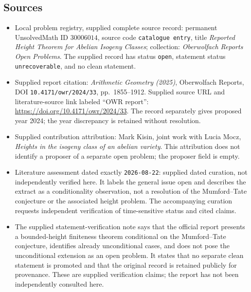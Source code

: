 \documentclass[11pt]{article}
\begin{document}
\subsection{Sources}
\begin{itemize}
\item Local problem registry, supplied complete source record: permanent UnsolvedMath ID \(30006014\), source code \texttt{catalogue entry}, title \emph{Reported Height Theorem for Abelian Isogeny Classes}; collection: \emph{Oberwolfach Reports Open Problems}. The supplied record has status \texttt{open}, statement status \texttt{unrecoverable}, and no clean statement.
\item Supplied report citation: \emph{Arithmetic Geometry (2025)}, Oberwolfach Reports, DOI \texttt{10.4171/owr/2024/33}, pp.\ 1855--1912. Supplied source URL and literature-source link labeled ``OWR report'': \url{https://doi.org/10.4171/owr/2024/33}. The record separately gives proposed year 2024; the year discrepancy is retained without resolution.
\item Supplied contribution attribution: Mark Kisin, joint work with Lucia Mocz, \emph{Heights in the isogeny class of an abelian variety}. This attribution does not identify a proposer of a separate open problem; the proposer field is empty.
\item Literature assessment dated exactly \texttt{2026-08-22}: supplied dated curation, not independently verified here. It labels the general issue open and describes the extract as a conditionality observation, not a resolution of the Mumford--Tate conjecture or the associated height problem. The accompanying curation requests independent verification of time-sensitive status and cited claims.
\item The supplied statement-verification note says that the official report presents a bounded-height finiteness theorem conditional on the Mumford--Tate conjecture, identifies already unconditional cases, and does not pose the unconditional extension as an open problem. It states that no separate clean statement is promoted and that the original record is retained publicly for provenance. These are supplied verification claims; the report has not been independently consulted here.
\end{itemize}
\end{document}
